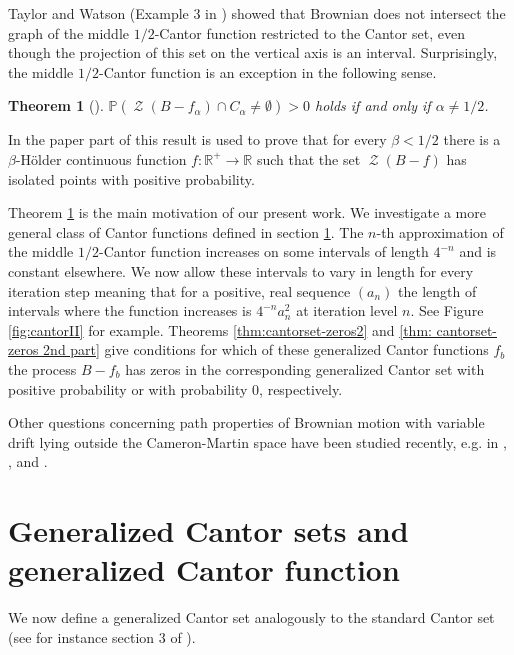 \documentclass[11pt,reqno]{amsart}
\theoremstyle{plain}
\newtheorem{theorem}{Theorem}[section]
\theoremstyle{definition}
\theoremstyle{remark}
\begin{document}
Taylor and Watson (Example 3 in \cite{TaylorWatson}) showed that Brownian does not intersect the graph of the middle $1/2$-Cantor function restricted to the Cantor set, even though the projection of this set on the vertical axis is an interval.
Surprisingly, the middle $1/2$-Cantor function is an exception in the following sense.

\begin{theorem}[\cite{ABPR}] \label{thm: ABPR}
$\mathbb{P}(\operatorname{\mathcal{Z}}(B-f_\alpha) \cap C_\alpha \neq \emptyset)>0$ holds if and only if $\alpha \neq 1/2$.
\end{theorem}
In the paper \cite{ABPR} part of this result is used to prove that for every $\beta<1/2$ there is a $\beta$-{H\"{o}lder } continuous function $f \colon \mathbb{R}^+ \to \mathbb{R}$ such that the set $\operatorname{\mathcal{Z}}(B-f)$ has isolated points with positive probability.

Theorem \ref{thm: ABPR} is the main motivation of our present work. We investigate a more general class of Cantor functions defined in section \ref{section: Cantor function def}. The $n$-th approximation of the middle $1/2$-Cantor function increases on some intervals of length $4^{-n}$ and is constant elsewhere. We now allow these intervals to vary in length for every iteration step meaning that for a positive, real sequence $(a_n)$ the length of intervals where the function increases is $4^{-n}a_n^2$ at iteration level $n$. See Figure \ref{fig:cantorII} for example.
Theorems \ref{thm:cantorset-zeros2} and \ref{thm: cantorset-zeros 2nd part} give conditions for which of these generalized Cantor functions $f_b$ the process $B-f_b$ has zeros in the corresponding generalized Cantor set with positive probability or with probability $0$, respectively.

Other questions concerning path properties of Brownian motion with variable drift lying outside the Cameron-Martin space have been studied recently, e.g. in \cite{ABPR}, \cite{APV}, \cite{PS} and \cite{R12}.

\section{Generalized Cantor sets and generalized Cantor function}\label{section: Cantor function def}

We now define a generalized Cantor set analogously to the standard Cantor set (see for instance section 3 of \cite{ABPR}). 
\end{document}
